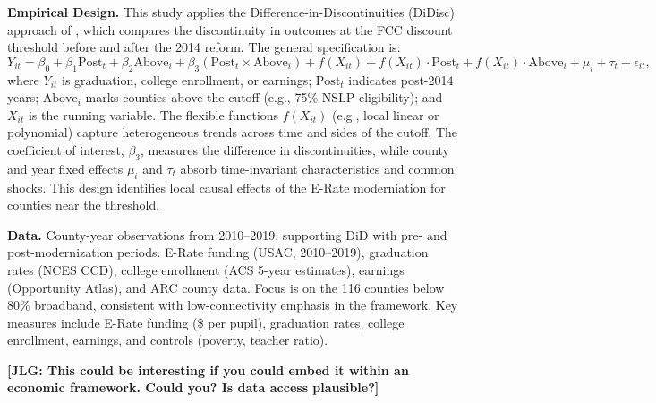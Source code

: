\textbf{Empirical Design.} This study applies the Difference-in-Discontinuities (DiDisc) approach of \citet{grembiFiscalRulesMatter2016}, which compares the discontinuity in outcomes at the FCC discount threshold before and after the 2014 reform. The general specification is:
\[
Y_{it} = \beta_0 + \beta_1 \text{Post}_t + \beta_2 \text{Above}_i + \beta_3 (\text{Post}_t \times \text{Above}_i) 
+ f(X_{it}) + f(X_{it}) \cdot \text{Post}_t + f(X_{it}) \cdot \text{Above}_i 
+ \mu_i + \tau_t + \epsilon_{it},
\]
where $Y_{it}$ is graduation, college enrollment, or earnings; $\text{Post}_t$ indicates post-2014 years; $\text{Above}_i$ marks counties above the cutoff (e.g., 75\% NSLP eligibility); and $X_{it}$ is the running variable. The flexible functions $f(X_{it})$ (e.g., local linear or polynomial) capture heterogeneous trends across time and sides of the cutoff. The coefficient of interest, $\beta_3$, measures the difference in discontinuities, while county and year fixed effects $\mu_i$ and $\tau_t$ absorb time-invariant characteristics and common shocks. This design identifies local causal effects of the E-Rate moderniation for counties near the threshold.


\textbf{Data.} County-year observations from 2010–2019, supporting DiD with pre- and post-modernization periods. E-Rate funding (USAC, 2010–2019), graduation rates (NCES CCD), college enrollment (ACS 5-year estimates), earnings (Opportunity Atlas), and ARC county data. Focus is on the 116 counties below 80\% broadband, consistent with low-connectivity emphasis in the framework. Key measures include E-Rate funding (\$ per pupil), graduation rates, college enrollment, earnings, and controls (poverty, teacher ratio).

\bigskip

\noindent \textbf{[JLG: This could be interesting if you could embed it within an economic framework. Could you? Is data access plausible?]}








